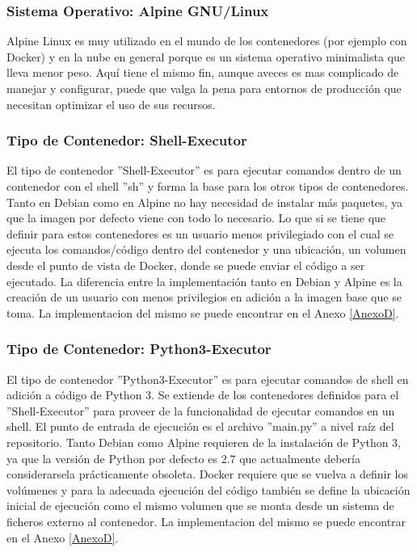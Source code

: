 \subsubsection{Sistema Operativo: Alpine GNU/Linux}
Alpine Linux es muy utilizado en el mundo de los contenedores (por ejemplo con Docker) y en la nube en general porque es un sistema operativo minimalista que lleva menor peso. Aquí tiene el mismo fin, aunque aveces es mas complicado de manejar y configurar, puede que valga la pena para entornos de producción que necesitan optimizar el uso de sus recursos.

\subsubsection{Tipo de Contenedor: Shell-Executor}
El tipo de contenedor ''Shell-Executor'' es para ejecutar comandos dentro de un contenedor con el shell ''sh'' y forma la base para los otros tipos de contenedores. Tanto en Debian como en Alpine no hay necesidad de instalar más paquetes, ya que la imagen por defecto viene con todo lo necesario. Lo que si se tiene que definir para estos contenedores es un usuario menos privilegiado con el cual se ejecuta los comandos/código dentro del contenedor y una ubicación, un volumen desde el punto de vista de Docker, donde se puede enviar el código a ser ejecutado. La diferencia entre la implementación tanto en Debian y Alpine es la creación de un usuario con menos privilegios en adición a la imagen base que se toma. La implementacion del mismo se puede encontrar en el Anexo \ref{AnexoD}.

\subsubsection{Tipo de Contenedor: Python3-Executor}
El tipo de contenedor ''Python3-Executor'' es para ejecutar comandos de shell en adición a código de Python 3. Se extiende de los contenedores definidos para el ''Shell-Executor'' para proveer de la funcionalidad de ejecutar comandos en un shell. El punto de entrada de ejecución es el archivo ''main.py'' a nivel raíz del repositorio. Tanto Debian como Alpine requieren de la instalación de Python 3, ya que la versión de Python por defecto es 2.7 que actualmente debería considerarsela prácticamente obsoleta. Docker requiere que se vuelva a definir los volúmenes y para la adecuada ejecución del código también se define la ubicación inicial de ejecución como el mismo volumen que se monta desde un sistema de ficheros externo al contenedor. La implementacion del mismo se puede encontrar en el Anexo \ref{AnexoD}.

